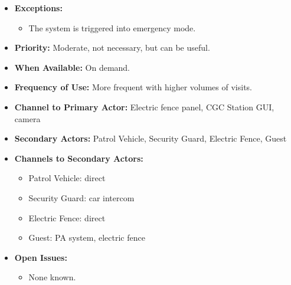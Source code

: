 \documentclass[12pt]{article}
\begin{document}
\begin{itemize}
        \item[]\textbf{Exceptions:}
            \begin{itemize}
                \item[] The system is triggered into emergency mode.
            \end{itemize}

        \item[]\textbf{Priority:}
            Moderate, not necessary, but can be useful.
            
        \item[]\textbf{When Available:}
            On demand.

        \item[]\textbf{Frequency of Use:}
            More frequent with higher volumes of visits.
            
        \item[]\textbf{Channel to Primary Actor:}
            Electric fence panel, CGC Station GUI, camera 

        \item[]\textbf{Secondary Actors:}
            Patrol Vehicle, Security Guard, Electric Fence, Guest
            
        \item[]\textbf{Channels to Secondary Actors:}
            \begin{itemize}
                \item[] Patrol Vehicle: direct
                \item[] Security Guard: car intercom
                \item[] Electric Fence: direct
                \item[] Guest: PA system, electric fence
            \end{itemize}

        \item[]\textbf{Open Issues:}
            \begin{itemize}
                \item[] None known.
            \end{itemize}
    \end{itemize}
     
\end{document}
